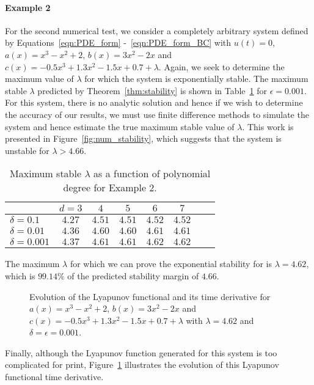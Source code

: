 \documentclass[9pt,journal,twocolumn]{IEEEtran}
\begin{document}
\paragraph*{Example 2} For the second numerical test, we consider a completely arbitrary system defined by Equations~\eqref{eqn:PDE_form} -~\eqref{eqn:PDE_form_BC} with $u(t)=0$, $a(x)=x^3-x^2+2$, $b(x)=3x^2-2x$ and $c(x)= -0.5x^3 + 1.3x^2 - 1.5x + 0.7+\lambda$. Again, we seek to determine the maximum value of $\lambda$ for which the system is exponentially stable. The maximum stable $\lambda$ predicted by Theorem~\ref{thm:stability} is shown in Table~\ref{table_analysis_1} for $\epsilon =0.001$. For this system, there is no analytic solution and hence if we wish to determine the accuracy of our results, we must use finite difference methods to simulate the system and hence estimate the true maximum stable value of $\lambda$. This work is presented in Figure~\ref{fig:num_stability}, which suggests that the system is unstable for $\lambda >  4.66 $.
\begin{table}{}
\begin{center}
    \begin{tabular}{l *{7}{c}}\hline \hline
 & $d=3$ & $4$ & $5$ & $6$ & $7$ \\ \hline
$\delta=0.1$ &  $4.27$ & $4.51$ & $4.51$ & $4.52$ & $4.52$ \\
$\delta=0.01$ & $4.36$ & $4.60$ & $4.60$ & $4.61$ & $4.61$ \\
$\delta=0.001$ & $4.37$ & $4.61$ & $4.61$ & $4.62$ & $4.62$
\end{tabular}
\end{center}
\caption{Maximum stable $\lambda$ as a function of polynomial degree for Example 2.}
\label{table_analysis_1}
\end{table}
The maximum $\lambda$ for which we can prove the exponential stability for is $\lambda=4.62$, which is $99.14 \%$ of the predicted stability margin of $4.66$.
\begin{figure}[ht]
\centering
{}
\quad
{}
\caption{Evolution of the Lyapunov functional and its time derivative for $a(x)=x^3-x^2+2$, $b(x)=3x^2-2x$ and $c(x)= -0.5x^3 + 1.3x^2 - 1.5x + 0.7+\lambda$ with $\lambda=4.62$ and $\delta = \epsilon =0.001$.}
\label{fig:V_analysis}
\end{figure}
Finally, although the Lyapunov function generated for this system is too complicated for print, Figure~\ref{fig:V_analysis} illustrates the evolution of this Lyapunov functional time derivative.
\end{document}
